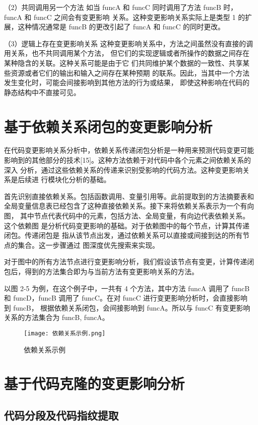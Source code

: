 （2）共同调用另一个方法
如当 funcA 和 funcC 同时调用了方法 funcB 时，funcA 和 funcC 之间会有变更影响
关系。这种变更影响关系实际上是类型 1 的扩展，这种情况通常是 funcB 的更改引起了
funcA 和 funcC 的同时更改。

（3）逻辑上存在变更影响关系
这种变更影响关系中，方法之间虽然没有直接的调用关系，也不共同调用某个方法，
但它们的实现逻辑或者所操作的数据之间存在某种隐含的关联。这种关系可能是由于它
们共同维护某个数据的一致性、共享某些资源或者它们的输出和输入之间存在某种预期
的联系。因此，当其中一个方法发生变化时，可能会间接影响到其他方法的行为或结果，
即使这种影响在代码的静态结构中不直接可见。

\section{基于依赖关系闭包的变更影响分析}

在代码变更影响关系分析中，依赖关系传递闭包分析是一种用来预测代码变更可能
影响到的其他部分的技术[15]。这种方法依赖于对代码中各个元素之间依赖关系的深入
分析，通过这些依赖关系的传递来识别受影响的代码方法。这种变更影响关系是后续进
行模块化分析的基础。

首先识别直接依赖关系。包括函数调用、变量引用等。此前提取到的方法摘要表和
全局变量信息表已经包含了这种直接依赖关系。接下来将依赖关系表示为一个有向图，
其中节点代表代码中的元素，包括方法、全局变量，有向边代表依赖关系。这个依赖图
是分析代码变更影响的基础。对于依赖图中的每个节点，计算其传递闭包。传递闭包是
指从该节点出发，通过依赖关系可以直接或间接到达的所有节点的集合。这一步骤通过
图深度优先搜索来实现。

对于图中的所有方法节点进行变更影响分析，我们假设该节点有变更，计算传递闭
包后，得到的方法集合即为与当前方法有变更影响关系的方法。

以图 2-5 为例，在这个例子中，一共有 4 个方法，其中方法 funcA 调用了 funcB 和
funcD，funcB 调用了 funcC。在对 funcC 进行变更影响分析时，会直接影响到 funcB，
根据依赖关系闭包，会间接影响到 funcA。所以与 funcC 有变更影响关系的方法集合为
{funcB, funcA}。

\begin{figure}[h]
\centering
\texttt{[image: 依赖关系示例.png]}
\caption{依赖关系示例}
\end{figure}

\section{基于代码克隆的变更影响分析}
\subsection{代码分段及代码指纹提取}
